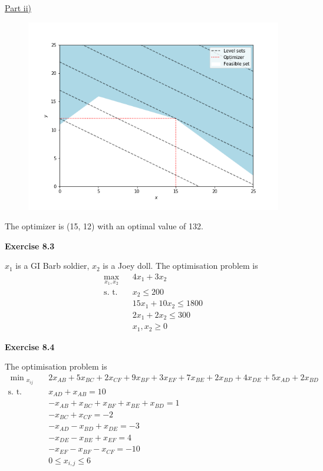 \documentclass[letterpaper,12pt]{article}
\begin{document}
\underline{Part ii)}
\begin{figure}[H]
	\centering
	\includegraphics[scale=0.45]{plot3.png}
	\label{plot1}
\end{figure}
The optimizer is (15, 12) with an optimal value of 132.

\textbf{Exercise 8.3}

$x_1$ is a GI Barb soldier, $x_2$ is a Joey doll. The optimisation problem is
\begin{align*}
\max_{x_1, x_2} \ & 4x_1 + 3x_2 \\
\text{s. t.} \quad & x_2 \leq 200 \\
& 15x_1 + 10 x_2 \leq 1800 \\
& 2x_1 + 2x_2 \leq 300 \\
& x_1, x_2 \geq 0
\end{align*}

\textbf{Exercise 8.4}

The optimisation problem is
\begin{align*}
\min{_{x_{ij}}} \quad & 2 x_{AB} + 5 x_{BC} + 2 x_{CF} + 9 x_{BF} + 3 x_{EF} + 7 x_{BE} + 2 x_{BD} + 4 x_{DE} + 5 x_{AD} + 2 x_{BD} \\
\text{s. t.} \quad & x_{AD} + x_{AB} = 10 \\
& -x_{AB} + x_{BC} + x_{BF} + x_{BE} + x_{BD} = 1 \\
& -x_{BC} + x_{CF} = -2 \\
& -x_{AD} - x_{BD} + x_{DE} = -3 \\
& -x_{DE} - x_{BE} + x_{EF} = 4 \\
& -x_{EF} - x_{BF} - x_{CF} = -10 \\
& 0 \leq x_{i, j} \leq 6
\end{align*}
\end{document}
